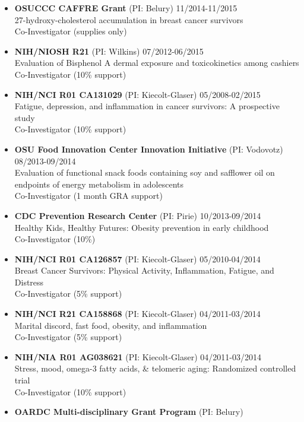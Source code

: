\documentclass[
  english,
  letterpaper,
  DIV=11,
  numbers=noendperiod]{scrartcl}
\begin{document}
\begin{itemize}
\item
  \textbf{OSUCCC CAFFRE Grant} (PI: Belury) {11/2014-11/2015}\\
  27-hydroxy-cholesterol accumulation in breast cancer survivors\\
  Co-Investigator (supplies only)
\item
  \textbf{NIH/NIOSH R21} (PI: Wilkins) {07/2012-06/2015}\\
  Evaluation of Bisphenol A dermal exposure and toxicokinetics among
  cashiers\\
  Co-Investigator (10\% support)
\item
  \textbf{NIH/NCI R01 CA131029} (PI: Kiecolt-Glaser) {05/2008-02/2015}\\
  Fatigue, depression, and inflammation in cancer survivors: A
  prospective study\\
  Co-Investigator (10\% support)
\item
  \textbf{OSU Food Innovation Center Innovation Initiative} (PI:
  Vodovotz) {08/2013-09/2014}\\
  Evaluation of functional snack foods containing soy and safflower oil
  on endpoints of energy metabolism in adolescents\\
  Co-Investigator (1 month GRA support)
\item
  \textbf{CDC Prevention Research Center} (PI: Pirie)
  {10/2013-09/2014}\\
  Healthy Kids, Healthy Futures: Obesity prevention in early childhood\\
  Co-Investigator (10\%)
\item
  \textbf{NIH/NCI R01 CA126857} (PI: Kiecolt-Glaser) {05/2010-04/2014}\\
  Breast Cancer Survivors: Physical Activity, Inflammation, Fatigue, and
  Distress\\
  Co-Investigator (5\% support)
\item
  \textbf{NIH/NCI R21 CA158868} (PI: Kiecolt-Glaser) {04/2011-03/2014}\\
  Marital discord, fast food, obesity, and inflammation\\
  Co-Investigator (5\% support)
\item
  \textbf{NIH/NIA R01 AG038621} (PI: Kiecolt-Glaser) {04/2011-03/2014}\\
  Stress, mood, omega-3 fatty acids, \& telomeric aging: Randomized
  controlled trial\\
  Co-Investigator (10\% support)
\item
  \textbf{OARDC Multi-disciplinary Grant Program} (PI: Belury)

\end{itemize}
\end{document}
